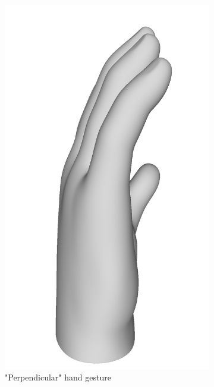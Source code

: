 \documentclass{ieeeaccess}
\begin{document}
\begin{figure}
\begin{subfigure}[b]{0.2\textwidth}
         \includegraphics[width=\textwidth]{perp3D.png}
         \caption{"Perpendicular" hand gesture}
         \label{fig:perp}
     \end{subfigure}
     \hfill
     \begin{subfigure}[b]{0.23\textwidth}
         \centering

\end{subfigure}
\end{figure}
\end{document}
